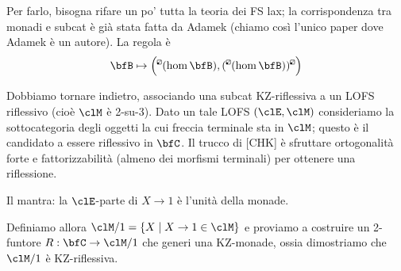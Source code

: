 \documentclass{amsart}
\newcommand{\dolp}[1]{\mathrel{
  \begin{tikzpicture}[scale=#1]
    \draw[rounded corners=.25pt, line width=.4pt] (0,0) rectangle (1,1);
    \draw[line width=.3pt] (0,0) -- (1,1);
    \fill (0,0) rectangle (.4,.4);
    \end{tikzpicture}
}}
\newcommand{\lp}{
\mathchoice{\dolp{.165}}
  {\dolp{.165}}
  {\mathrel{\dolp{.1325}}}
  {\mathrel{\dolp{.1}}}
}
\begin{document}
Per farlo, bisogna rifare un po' tutta la teoria dei FS lax; la corrispondenza tra monadi e subcat è già stata fatta da Adamek (chiamo così l'unico paper dove Adamek è un autore). La regola è
\[
\bfB \mapsto \Big({}^{\lp}(\hom\bfB), ({}^{\lp}(\hom\bfB))^{\lp}\Big)
\]

Dobbiamo tornare indietro, associando una subcat KZ-riflessiva a un LOFS riflessivo (cioè $\clM$ è 2-su-3). Dato un tale LOFS $(\clE,\clM)$ consideriamo la sottocategoria degli oggetti la cui freccia terminale sta in $\clM$; questo è il candidato a essere riflessivo in $\bfC$. Il trucco di [CHK] è sfruttare ortogonalità forte e fattorizzabilità (almeno dei morfismi terminali) per ottenere una riflessione. 

Il mantra: la $\clE$-parte di $X \to 1$ è l'unità della monade.

Definiamo allora $\clM/1 = \{X\mid X\to 1\in\clM\}$ e proviamo a costruire un 2-funtore $R : \bfC \to \clM/1$ che generi una KZ-monade, ossia dimostriamo che $\clM/1$ è KZ-riflessiva.
\end{document}
